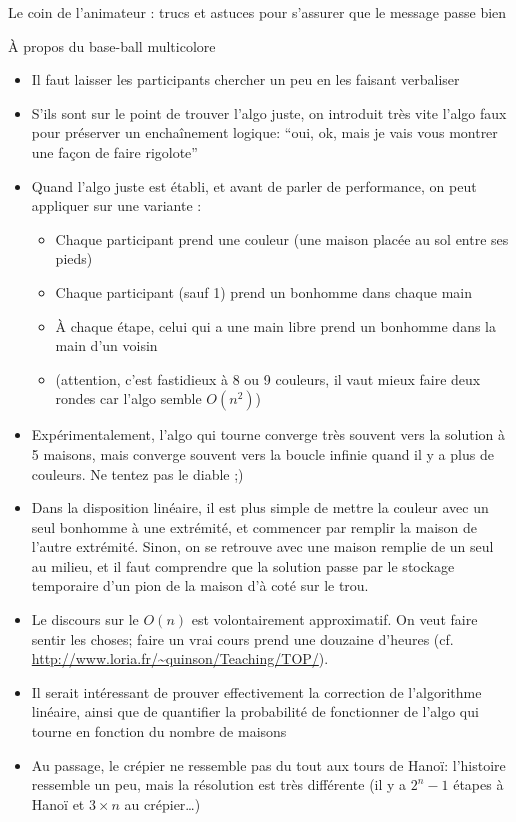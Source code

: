 \begin{frame}{Le coin de l'animateur : trucs et astuces pour s'assurer que le message passe bien}
\begin{block}{À propos du base-ball multicolore}
    \begin{itemize}
    \item Il faut laisser les participants chercher un peu en les faisant verbaliser
    \item S'ils sont sur le point de trouver l'algo juste, on introduit très vite l'algo faux pour préserver un enchaînement logique: ``oui, ok, mais je vais vous montrer une façon de faire rigolote''
    \item Quand l'algo juste est établi, et avant de parler de performance, on peut appliquer sur une variante :
      \begin{itemize}
      \item Chaque participant prend une couleur (une maison placée au sol entre ses pieds)
      \item Chaque participant (sauf 1) prend un bonhomme dans chaque main
      \item À chaque étape, celui qui a une main libre prend un bonhomme dans la main d'un voisin
      \item (attention, c'est fastidieux à 8 ou 9 couleurs, il vaut mieux faire deux rondes car l'algo semble $O(n^2)$)
      \end{itemize}
    \item Expérimentalement, l'algo qui tourne converge très souvent vers la solution à 5 maisons, mais converge souvent vers la boucle infinie quand il y a plus de couleurs. Ne tentez pas le diable ;)
    \item Dans la disposition linéaire, il est plus simple de mettre la couleur avec un seul bonhomme à une extrémité, et commencer par remplir la maison de l'autre extrémité. Sinon, on se retrouve avec une maison remplie de un seul au milieu, et il faut comprendre que la solution passe par le stockage temporaire d'un pion de la maison d'à coté sur le trou.
    \item Le discours sur le $O(n)$ est volontairement approximatif. On veut faire sentir les choses; faire un vrai cours prend une douzaine d'heures (cf. \url{http://www.loria.fr/~quinson/Teaching/TOP/}).
    \item Il serait intéressant de prouver effectivement la correction de l'algorithme linéaire, ainsi que de quantifier la probabilité de fonctionner de l'algo qui tourne en fonction du nombre de maisons
    \item Au passage, le crépier ne ressemble pas du tout aux tours de Hanoï: l'histoire ressemble un peu, mais la résolution est très différente (il y a $2^n-1$ étapes à Hanoï et $3\times n$ au crépier\ldots)
    \end{itemize}
  \end{block}
\end{frame}
